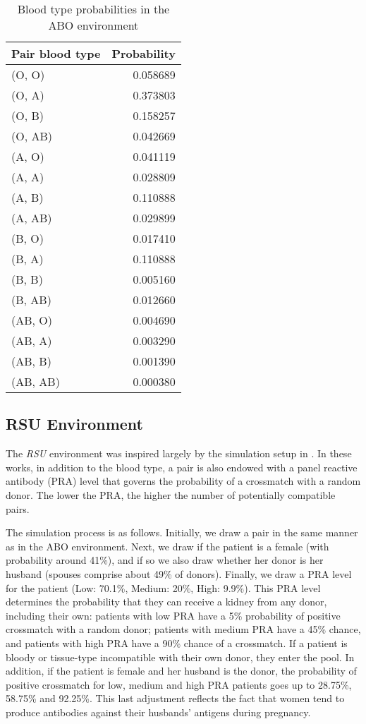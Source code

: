 \documentclass[12pt]{article}
\begin{document}
\begin{table}[H]
\centering
\begin{tabular}{lr}
\toprule
Pair blood type &         Probability \\
\midrule
(O, O) &  0.058689 \\
(O, A) &  0.373803 \\
(O, B) &  0.158257 \\
(O, AB) &  0.042669 \\
(A, O) &  0.041119 \\
(A, A) &  0.028809 \\
(A, B) &  0.110888 \\
(A, AB) &  0.029899 \\
(B, O) &  0.017410 \\
(B, A) &  0.110888 \\
(B, B) &  0.005160 \\
(B, AB) &  0.012660 \\
(AB, O) &  0.004690 \\
(AB, A) &  0.003290 \\
(AB, B) &  0.001390 \\
(AB, AB) &  0.000380 \\
\bottomrule
\end{tabular}
\caption{Blood type probabilities in the ABO environment}
\label{tab:abo_blood_type}
\end{table}

\subsection{RSU Environment}

The \emph{RSU} environment was inspired largely by the simulation setup in \cite{roth2007efficient}. In these works, in addition to the blood type, a pair is also endowed with a panel reactive antibody (PRA) level that governs the probability of a crossmatch with a random donor. The lower the PRA, the higher the number of potentially compatible pairs.

The simulation process is as follows. Initially, we draw a pair in the same manner as in the ABO environment. Next, we draw if the patient is a female (with probability around 41\%), and if so we also draw whether her donor is her husband (spouses comprise about 49\% of donors). Finally, we draw a PRA level for the patient (Low: 70.1\%, Medium: 20\%, High: 9.9\%). This PRA level determines the probability that they can receive a kidney from any donor, including their own: patients with low PRA have a 5\% probability of positive crossmatch with a random donor; patients with medium PRA have a 45\% chance, and patients with high PRA have a 90\% chance of a crossmatch. If a patient is bloody or tissue-type incompatible with their own donor, they enter the pool. In addition, if the patient is female and her husband is the donor, the probability of positive crossmatch for low, medium and high PRA patients goes up to 28.75\%, 58.75\% and 92.25\%. This last adjustment reflects the fact that women tend to produce antibodies against their husbands' antigens during pregnancy.
\end{document}
